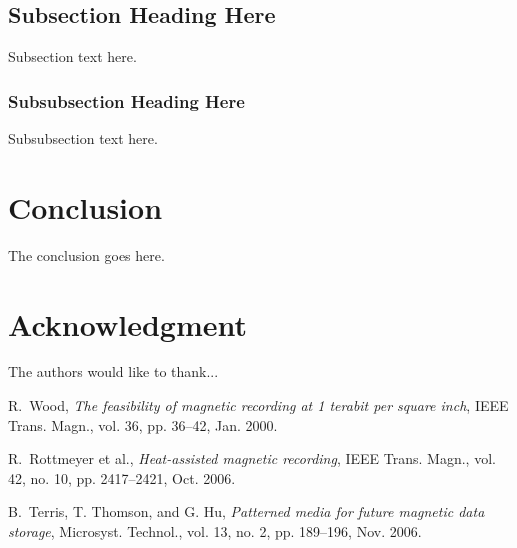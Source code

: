 \documentclass[conference]{IEEEtran}
\begin{document}
\subsection{Subsection Heading Here}
Subsection text here.


\subsubsection{Subsubsection Heading Here}
Subsubsection text here.



\section{Conclusion}
The conclusion goes here.


\section*{Acknowledgment}


The authors would like to thank...

\begin{thebibliography}{1}

R.~Wood, \emph{The feasibility of magnetic recording at 1 terabit per square
inch}, IEEE Trans. Magn., vol. 36, pp. 36–42, Jan. 2000.

R.~Rottmeyer et al., \emph{Heat-assisted magnetic recording}, IEEE Trans.
Magn., vol. 42, no. 10, pp. 2417–2421, Oct. 2006.

B.~Terris, T. Thomson, and G. Hu, \emph{Patterned media for future magnetic
data storage}, Microsyst. Technol., vol. 13, no. 2, pp. 189–196, Nov.
2006.

\end{thebibliography}


\end{document}
